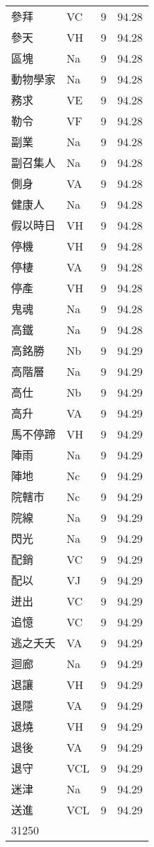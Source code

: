\documentclass[twocolumn]{book}
\begin{document}
\begin{supertabular}{llrr}
參拜 & VC & 9 &  94.28\\
參天 & VH & 9 &  94.28\\
區塊 & Na & 9 &  94.28\\
動物學家 & Na & 9 &  94.28\\
務求 & VE & 9 &  94.28\\
勒令 & VF & 9 &  94.28\\
副業 & Na & 9 &  94.28\\
副召集人 & Na & 9 &  94.28\\
側身 & VA & 9 &  94.28\\
健康人 & Na & 9 &  94.28\\
假以時日 & VH & 9 &  94.28\\
停機 & VH & 9 &  94.28\\
停棲 & VA & 9 &  94.28\\
停產 & VH & 9 &  94.28\\
鬼魂 & Na & 9 &  94.28\\
高鐵 & Na & 9 &  94.28\\
高銘勝 & Nb & 9 &  94.29\\
高階層 & Na & 9 &  94.29\\
高仕 & Nb & 9 &  94.29\\
高升 & VA & 9 &  94.29\\
馬不停蹄 & VH & 9 &  94.29\\
陣雨 & Na & 9 &  94.29\\
陣地 & Nc & 9 &  94.29\\
院轄市 & Nc & 9 &  94.29\\
院線 & Na & 9 &  94.29\\
閃光 & Na & 9 &  94.29\\
配銷 & VC & 9 &  94.29\\
配以 & VJ & 9 &  94.29\\
迸出 & VC & 9 &  94.29\\
追憶 & VC & 9 &  94.29\\
逃之夭夭 & VA & 9 &  94.29\\
迴廊 & Na & 9 &  94.29\\
退讓 & VH & 9 &  94.29\\
退隱 & VA & 9 &  94.29\\
退燒 & VH & 9 &  94.29\\
退後 & VA & 9 &  94.29\\
退守 & VCL & 9 &  94.29\\
迷津 & Na & 9 &  94.29\\
送進 & VCL & 9 &  94.29\\
31250\\

\end{supertabular}
\end{document}
